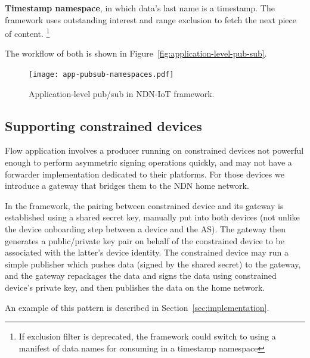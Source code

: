 \textbf{Timestamp namespace}, in which data's last name is a timestamp. The framework uses outstanding interest and range exclusion to fetch the next piece of content.
\footnote{If exclusion filter is deprecated, the framework could switch to using a manifest of data names for consuming in a timestamp namespace}

The workflow of both is shown in Figure~\ref{fig:application-level-pub-sub}.

\begin{figure}[!t]
\centering
\texttt{[image: app-pubsub-namespaces.pdf]}
\caption{Application-level pub/sub in NDN-IoT framework.}
\label{fig:flow-discovery-process}
\end{figure}

\subsection{Supporting constrained devices}

Flow application involves a producer running on constrained devices not powerful enough to perform asymmetric signing operations quickly, and may not have a forwarder implementation dedicated to their platforms. 
For those devices we introduce a gateway that bridges them to the NDN home network.

In the framework, the pairing between constrained device and its gateway is established using a shared secret key, manually put into both devices (not unlike the device onboarding step between a device and the AS).
The gateway then generates a public/private key pair on behalf of the constrained device to be associated with the latter's device identity.
The constrained device may run a simple publisher which pushes data (signed by the shared secret) to the gateway, and the gateway repackages the data and signs the data using constrained device's private key, and then publishes the data on the home network.

An example of this pattern is described in Section~\ref{sec:implementation}.

